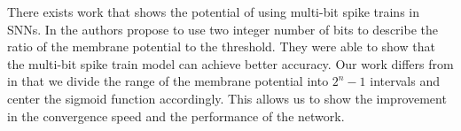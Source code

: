 There exists work that shows the potential of using multi-bit spike trains in SNNs. In \cite{xiao2024multibitmechanismnovelinformation} the authors propose to use two integer number of bits to describe the ratio of the membrane potential to the threshold. They were able to show that the multi-bit spike train model can achieve better accuracy. 
Our work differs from \cite{xiao2024multibitmechanismnovelinformation} in that we divide the range of the membrane potential into $2^n-1$ intervals and center the sigmoid function accordingly. This allows us to show the improvement in the convergence speed and the performance of the network.